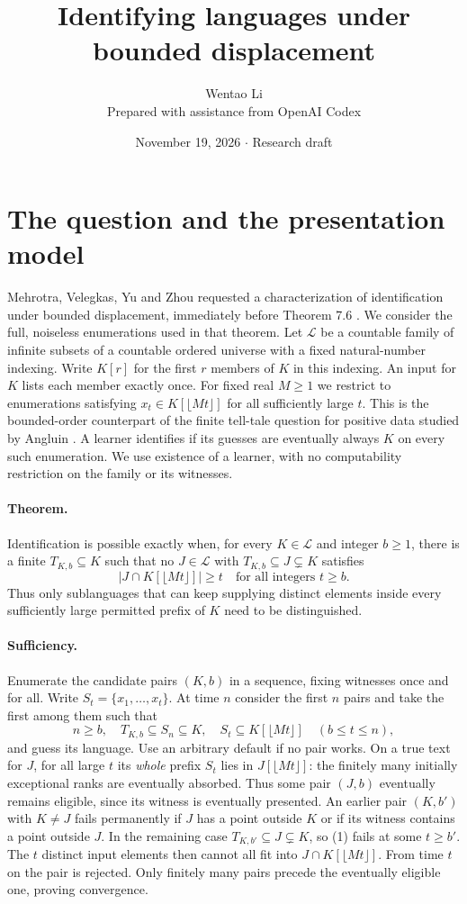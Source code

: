 \documentclass[11pt]{article}
\title{Identifying languages under bounded displacement}
\author{Wentao Li\\{\small Prepared with assistance from OpenAI Codex}}
\date{November 19, 2026 \quad $\cdot$ \quad Research draft}
\begin{document}
\maketitle
\section*{The question and the presentation model}
Mehrotra, Velegkas, Yu and Zhou requested a characterization of identification under bounded displacement, immediately before Theorem 7.6 \cite{mv}. We consider the full, noiseless enumerations used in that theorem. Let $\mathcal L$ be a countable family of infinite subsets of a countable ordered universe with a fixed natural-number indexing. Write $K[r]$ for the first $r$ members of $K$ in this indexing. An input for $K$ lists each member exactly once. For fixed real $M\ge1$ we restrict to enumerations satisfying $x_t\in K[\lfloor Mt\rfloor]$ for all sufficiently large $t$. This is the bounded-order counterpart of the finite tell-tale question for positive data studied by Angluin \cite{ang}. A learner identifies if its guesses are eventually always $K$ on every such enumeration. We use existence of a learner, with no computability restriction on the family or its witnesses.

\paragraph{Theorem.} Identification is possible exactly when, for every $K\in\mathcal L$ and integer $b\ge1$, there is a finite $T_{K,b}\subseteq K$ such that no $J\in\mathcal L$ with $T_{K,b}\subseteq J\subsetneq K$ satisfies
\[
             |J\cap K[\lfloor Mt\rfloor]|\ge t
             \quad\text{for all integers }t\ge b. \tag{1}
\]
Thus only sublanguages that can keep supplying distinct elements inside every sufficiently large permitted prefix of $K$ need to be distinguished.

\paragraph{Sufficiency.} Enumerate the candidate pairs $(K,b)$ in a sequence, fixing witnesses once and for all. Write $S_t=\{x_1,\ldots,x_t\}$. At time $n$ consider the first $n$ pairs and take the first among them such that
\[
 n\ge b,\quad T_{K,b}\subseteq S_n\subseteq K,\quad
 S_t\subseteq K[\lfloor Mt\rfloor]\quad (b\le t\le n),
\]
and guess its language. Use an arbitrary default if no pair works. On a true text for $J$, for all large $t$ its \emph{whole} prefix $S_t$ lies in $J[\lfloor Mt\rfloor]$: the finitely many initially exceptional ranks are eventually absorbed. Thus some pair $(J,b)$ eventually remains eligible, since its witness is eventually presented. An earlier pair $(K,b')$ with $K\ne J$ fails permanently if $J$ has a point outside $K$ or if its witness contains a point outside $J$. In the remaining case $T_{K,b'}\subseteq J\subsetneq K$, so (1) fails at some $t\ge b'$. The $t$ distinct input elements then cannot all fit into $J\cap K[\lfloor Mt\rfloor]$. From time $t$ on the pair is rejected. Only finitely many pairs precede the eventually eligible one, proving convergence.
\end{document}
